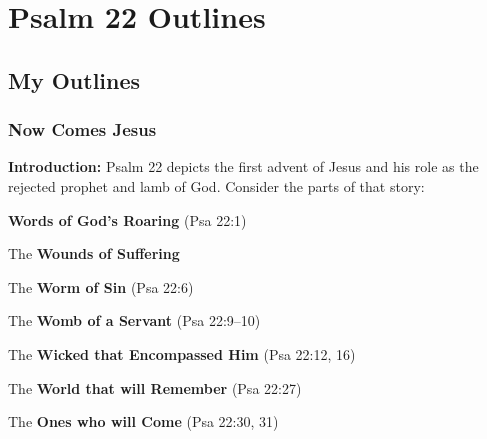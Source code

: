 \section{Psalm 22 Outlines}

\subsection{My Outlines}

\subsubsection{Now Comes Jesus}
\textbf{Introduction: }Psalm 22 depicts the first advent of Jesus and his role as the rejected prophet and lamb of God. Consider the parts of that story:
\begin{compactenum}[I.][8]
    \item \textbf{Words of God's Roaring}  (Psa 22:1)
    \item The \textbf{Wounds of Suffering} 
    \item The \textbf{Worm of Sin}  (Psa 22:6)
    \item The \textbf{Womb of a Servant}  (Psa 22:9--10)
    \item The \textbf{Wicked that Encompassed Him}   (Psa 22:12, 16)
    \item The \textbf{World that will Remember}  (Psa 22:27)
    \item The \textbf{Ones who will Come}   (Psa 22:30, 31)
\end{compactenum}

